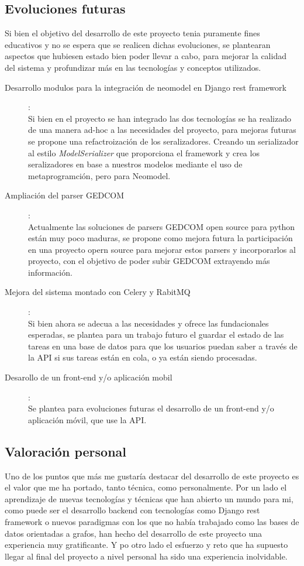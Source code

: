 \subsection{Evoluciones futuras}
Si bien el objetivo del desarrollo de este proyecto tenia puramente fines educativos y no se espera que se realicen dichas evoluciones, se plantearan aspectos que hubiesen estado bien poder llevar a cabo, para mejorar la calidad del sistema y profundizar más en las tecnologías y conceptos utilizados.
\begin{description}
	\item[Desarrollo modulos para la integración de neomodel en Django rest framework]:\\
	Si bien en el proyecto se han integrado las dos tecnologías se ha realizado de una manera ad-hoc a las necesidades del proyecto, para mejoras futuras se propone una refactroización de los seralizadores. Creando un serializador al estilo \textit{ModelSerializer} que proporciona el framework y crea los seralizadores en base a nuestros modelos mediante el uso de metaprogramción, pero para Neomodel.
	
	\item[Ampliación del parser GEDCOM]:\\Actualmente las soluciones de parsers GEDCOM open source para python están muy poco maduras, se propone como mejora futura la participación en una proyecto opern source para mejorar estos parsers y incorporarlos al proyecto, con el objetivo de poder subir GEDCOM extrayendo más información.
	
	\item[Mejora del sistema montado con Celery y RabitMQ]:\\Si bien ahora se adecua a las necesidades y ofrece las fundacionales esperadas, se plantea para un trabajo futuro el guardar el estado de las tareas en una base de datos para que los usuarios puedan saber a través de la API si sus tareas están en cola, o ya están siendo procesadas.
	
	\item[Desarollo de un front-end y/o aplicación mobil]:\\Se plantea para evoluciones futuras el desarrollo de un front-end y/o aplicación móvil, que use la API.
\end{description}
\newpage
\subsection{Valoración personal}
Uno de los puntos que más me gustaría destacar del desarrollo de este proyecto es el valor que me ha portado, tanto técnica, como personalmente. Por un lado el aprendizaje de nuevas tecnologías y técnicas que han abierto un mundo para mi, como puede ser el desarrollo backend con tecnologías como Django rest framework o nuevos paradigmas con los que no había trabajado como las bases de datos orientadas a grafos, han hecho del desarrollo de este proyecto una experiencia muy gratificante. Y po otro lado el esfuerzo y reto que ha supuesto llegar al final del proyecto a nivel personal ha sido una experiencia inolvidable. 